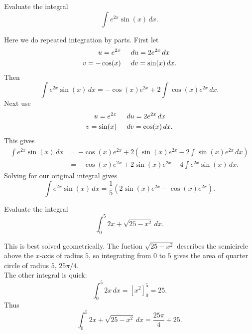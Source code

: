 \documentclass{article}
\newenvironment{problem}[2][Problem]{\begin{trivlist}
\item[\hskip \labelsep {\bfseries #1}\hskip \labelsep {\bfseries #2.}]}{\end{trivlist}}
\newenvironment{solution}[1][Solution.]{\begin{trivlist}
\item[\hskip \labelsep {\bfseries #1}]}{\end{trivlist}}
\begin{document}
\pagebreak
\begin{problem}{5}
  Evaluate the integral \[
    \int e^{2x}\sin(x)\,dx.
  \]
\end{problem}

\begin{solution} $ $\\
  Here we do repeated integration by parts.
  First let \begin{align*}
    u = e^{2x}  &\hspace{0.5cm} du = 2e^{2x}\,dx \\
    v = -\cos(x) &\hspace{0.5cm} dv = \sin(x) \,dx.
  \end{align*} Then \[
    \int e^{2x}\sin(x)\,dx = -\cos(x)e^{2x} + 2\int \cos(x)e^{2x}\,dx.
  \]
  Next use \begin{align*}
    u = e^{2x}  &\hspace{0.5cm} du = 2e^{2x}\,dx \\
    v = \sin(x) &\hspace{0.5cm} dv = \cos(x) \,dx.
  \end{align*}
  This gives \begin{align*}
    \int e^{2x}\sin(x)\,dx
    &= -\cos(x)e^{2x} + 2\left(\sin(x)e^{2x} - 2\int \sin(x)e^{2x}\,dx\right)\\
    &= -\cos(x)e^{2x} + 2\sin(x)e^{2x} - 4\int e^{2x}\sin(x)\,dx.
  \end{align*}
  Solving for our original integral gives \[
    \int e^{2x}\sin(x)\,dx = \frac{1}{5}\left(2\sin(x)e^{2x}-\cos(x)e^{2x}\right).
  \]

\end{solution}

\begin{problem}{6}
  Evaluate the integral \[
    \int_0^5 2x + \sqrt{25 - x^2}\,dx.
  \]
\end{problem}

\begin{solution} $ $\\
  This is best solved geometrically. The fuction $\sqrt{25 - x^2}$ describes the
  semicircle above the $x$-axis of radius $5$, so integrating from $0$ to $5$
  gives the area of quarter circle of radius $5$, $25\pi/4$.\\
  The other integral is quick: \[
    \int_0^5 2x\,dx = [x^2]_0^5 = 25.
  \]
  Thus \[
    \int_0^5 2x + \sqrt{25 - x^2}\,dx = \frac{25\pi}{4} + 25.
  \]

\end{solution}
\end{document}
